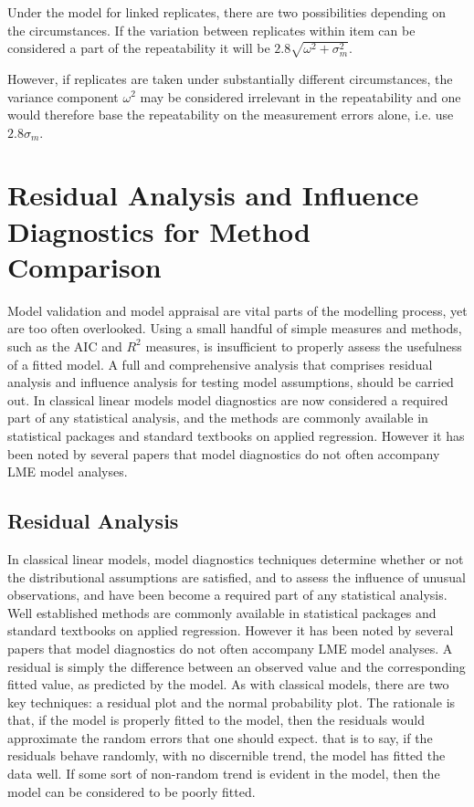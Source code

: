 \documentclass[12pt, a4paper]{report}
\theoremstyle{plain}
\theoremstyle{definition}
\theoremstyle{remark}
\begin{document}
	Under the model for linked replicates, there are two
	possibilities depending on the circumstances.
	If the variation between replicates within item can be
	considered a part of the repeatability it will be $2.8 \sqrt{
		\omega^2 + \sigma^2_m}$.
	
	However, if replicates are taken under substantially
	different circumstances, the variance component $\omega^2$ may be considered irrelevant in the repeatability and one would therefore
	base the repeatability on the measurement errors alone, i.e. use $2.8 \sigma_m$.
	
	\chapter{Residual Analysis and Influence Diagnostics for Method Comparison}
	Model validation and model appraisal are vital parts of the modelling process, yet are too often overlooked.	Using a small handful of simple measures and methods, such as the AIC and $R^2$ measures, is insufficient to properly assess the usefulness of a fitted model. A full and comprehensive
	analysis that comprises residual analysis and influence analysis for testing model assumptions, should be carried out.  In classical linear models model diagnostics are now considered a required part of any statistical analysis, and the methods are commonly available in statistical packages and standard textbooks on applied regression. However it has been noted by several papers \citep{Christensen, schabenberger} that model diagnostics do not often accompany LME model analyses.
	
	\section{Residual Analysis}
	In classical linear models, model diagnostics techniques determine whether or not the distributional assumptions are satisfied, and to assess the influence of unusual observations, and have been become a required part of any statistical analysis. Well established methods are commonly available in statistical packages and standard textbooks on applied regression. However it has been noted by several papers that model diagnostics do not often accompany LME model analyses. A residual is simply the difference between an observed value and the corresponding fitted value, as predicted by the model. As with classical models, there are two key techniques: a residual plot and the normal probability plot. The rationale is that, if the model is properly fitted to the model, then the residuals would approximate the random errors that one should expect.
	that is to say, if the residuals behave randomly, with no discernible trend, the model has fitted the data well. If some sort of non-random trend is evident in the model, then the model can be considered to be poorly fitted. 
	
\end{document}
